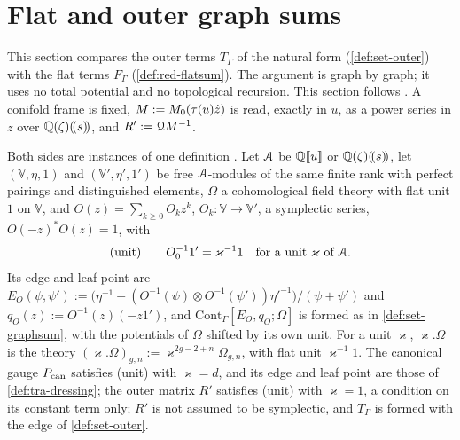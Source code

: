 \section{Flat and outer graph sums}
\label{sec:flh}

This section compares the outer terms $T_\Gamma$ of the natural form (\cref{def:set-outer}) with the flat terms $F_\Gamma$ (\cref{def:red-flatsum}).
The argument is graph by graph; it uses no total potential and no topological recursion. This section follows . A conifold frame is fixed, $M:=M_{0}(\tau(u)\hat{z})$ is read, exactly in $u$, as a power series in $z$ over $\mathbb{Q}(\zeta)(\!(s)\!)$, and $R':=\mathcal{Q} M^{-1}$.

Both sides are instances of one definition . Let $\mathcal{A}$ be $\mathbb{Q}[\![ u ]\!]$ or $\mathbb{Q}(\zeta)(\!(s)\!)$, let $(\mathbb V,\eta,1)$ and $(\mathbb V',\eta',1')$ be free $\mathcal{A}$-modules of the same finite rank with perfect pairings and distinguished elements, $\Omega$ a cohomological field theory with flat unit $1$ on $\mathbb V$, and $O(z)=\sum_{k\geq0}O_kz^k$, $O_k\colon\mathbb V\to\mathbb V'$, a symplectic series, $O(-z)^*O(z)=1$, with
\[
\text{(unit)}\qquad O_0^{-1}1'=\varkappa^{-1}1\quad\text{for a unit }\varkappa\text{ of }\mathcal{A} .
\]
Its edge and leaf point are $E_O(\psi,\psi'):=\bigl(\eta^{-1}-(O^{-1}(\psi)\otimes O^{-1}(\psi'))\eta'^{-1}\bigr)/(\psi+\psi')$ and $q_O(z):=O^{-1}(z)(-z1')$, and $\mathrm{Cont}_\Gamma[E_O,q_O;\Omega]$ is formed as in \cref{def:set-graphsum}, with the potentials of $\Omega$ shifted by its own unit. For a unit $\varkappa$, $\varkappa.\Omega$ is the theory $(\varkappa.\Omega)_{g,n}:=\varkappa^{2g-2+n}\Omega_{g,n}$, with flat unit $\varkappa^{-1}1$. The canonical gauge $P_{\mathrm{can}}$ satisfies (unit) with $\varkappa=d$, and its edge and leaf point are those of \cref{def:tra-dressing}; the outer matrix $R'$ satisfies (unit) with $\varkappa=1$, a condition on its constant term only; $R'$ is not assumed to be symplectic, and $T_\Gamma$ is formed with the edge of \cref{def:set-outer}.

